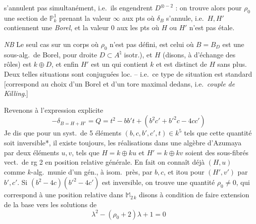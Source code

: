 \documentclass[11pt,a4paper]{article}
\begin{document}
s'annulent pas simultanément, i.e.\ ils engendrent $D^{\otimes -2}$ : on trouve alors pour $\rho_{0}$ une section de $\mathbb{P}^{1}_{k}$ prenant la valeur $\infty$ aux pts où $\delta_{B}$ s'annule,  i.e.\ $H,H'$ contiennent une  \emph{Borel}, et la valeur $0$ aux les pts où $H$ ou $H'$ n'est pas étale.

\emph{NB} Le seul cas sur un corps où $\rho_{0}$ n'est pas défini, est celui où $B=B_{D}$ est une sous-alg.\ de Borel, pour droite $D\subset A^{\natural}$ isotr.), et $H$ (disons, à  d'échange des rôles) est $k\oplus D$, et enfin $H'$ est  un   qui contient $k$ et est distinct de $H$ sans plus.  Deux telles situations sont conjuguées loc. -- i.e.\ ce type de situation est standard [correspond au choix d'un Borel et d'un tore maximal dedans, i.e.\ \emph{couple de Killing}.]

Revenons à l'expression explicite
\[
-\delta_{B=H+H'}=Q=t^{2}-bb't+(b^{2}c'+b'^{2}c-4cc')
\]
Je dis que pour un syst.\ de 5 éléments $(b,c,b',c',t)\in k^{5}$ tels que cette quantité soit inversible*, il existe toujours,   les réalisations dans une algèbre d'Azumaya par deux éléments $u,v$,  tels que $H=k\oplus ku$ et $H'=k\oplus kv$ soient des sous-fibrés vect.\ de rg 2 en position relative générale. En fait on connaît déjà $(H,u)$ comme $k$-alg.\ munie d'un gén., à isom.\ près, par $b,c$, et itou pour $(H',v')$ par $b',c'$. Si $(b^{2}-4c)(b'^{2}-4c')$  est inversible, on trouve une quantité $\rho_{0}\neq 0$, qui correspond à  une position relative dans $\mathbb{M}_{2\,k}$ disons à condition de faire extension de la base vers les solutions de
\[
\lambda^{2}-(\rho_{0}+2)\lambda+1=0
\]
\end{document}
